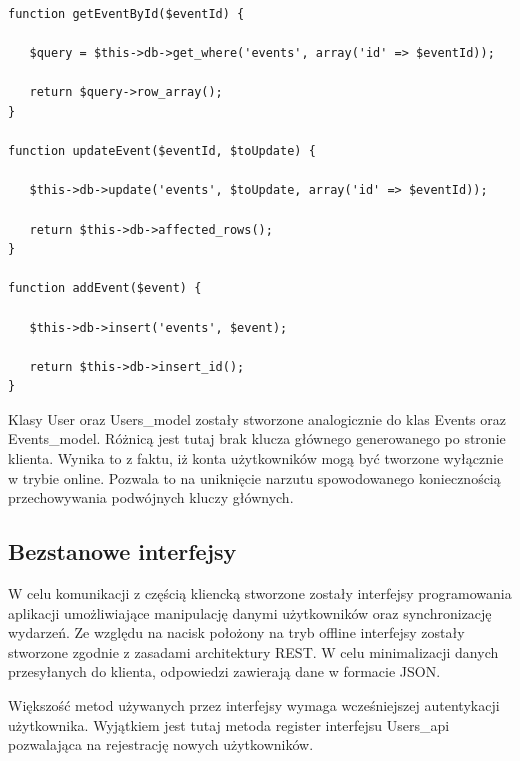 \begin{lstlisting}[style=php, caption=Przykładowe metody klasy Events\_model odpowiedzialne za komunikację z bazą danych., label=amb, captionpos=b]
function getEventById($eventId) {
	
   $query = $this->db->get_where('events', array('id' => $eventId));

   return $query->row_array();
}

function updateEvent($eventId, $toUpdate) {

   $this->db->update('events', $toUpdate, array('id' => $eventId));

   return $this->db->affected_rows();
}

function addEvent($event) {
   	
   $this->db->insert('events', $event);

   return $this->db->insert_id();
}
\end{lstlisting}

Klasy User oraz Users\_model zostały stworzone analogicznie do klas Events oraz Events\_model. Różnicą jest tutaj brak klucza głównego generowanego po stronie klienta. Wynika to z faktu, iż konta użytkowników mogą być tworzone wyłącznie w trybie online. Pozwala to na uniknięcie narzutu spowodowanego koniecznością przechowywania podwójnych kluczy głównych.

\subsection{Bezstanowe interfejsy}
\label{bezstInter}

W celu komunikacji z częścią kliencką stworzone zostały interfejsy programowania aplikacji umożliwiające manipulację danymi użytkowników oraz synchronizację wydarzeń. Ze względu na nacisk położony na tryb offline interfejsy zostały stworzone zgodnie z zasadami architektury REST. W celu minimalizacji danych przesyłanych do klienta, odpowiedzi zawierają dane w formacie JSON.

Większość metod używanych przez interfejsy wymaga wcześniejszej autentykacji użytkownika. Wyjątkiem jest tutaj metoda register interfejsu Users\_api pozwalająca na rejestrację nowych użytkowników.

